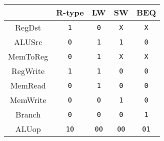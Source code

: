 \begin{tabular}[t]{ccccc}
    \toprule
             & R-type      & LW          & SW          & BEQ         \\
    \midrule
    RegDst   & \texttt{1}  & \texttt{0}  & \texttt{X}  & \texttt{X}  \\
    ALUSrc   & \texttt{0}  & \texttt{1}  & \texttt{1}  & \texttt{0}  \\
    MemToReg & \texttt{0}  & \texttt{1}  & \texttt{X}  & \texttt{X}  \\
    RegWrite & \texttt{1}  & \texttt{1}  & \texttt{0}  & \texttt{0}  \\
    MemRead  & \texttt{0}  & \texttt{1}  & \texttt{0}  & \texttt{0}  \\
    MemWrite & \texttt{0}  & \texttt{0}  & \texttt{1}  & \texttt{0}  \\
    Branch   & \texttt{0}  & \texttt{0}  & \texttt{0}  & \texttt{1}  \\
    ALUop    & \texttt{10} & \texttt{00} & \texttt{00} & \texttt{01} \\
    \bottomrule
\end{tabular}
